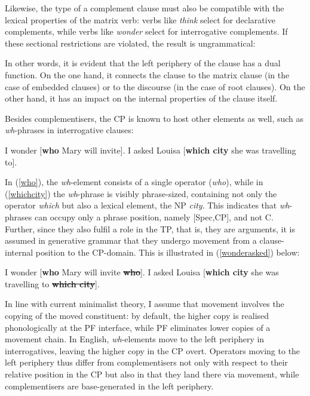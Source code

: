 \ea \label{finnonfin}
\z
\z

Likewise, the type of a complement clause must also be compatible with the lexical properties of the matrix verb: verbs like \textit{think} select for declarative complements, while verbs like \textit{wonder} select for interrogative complements. If these sectional restrictions are violated, the result is ungrammatical:

\ea
{}
\z
\z

In other words, it is evident that the left periphery of the clause has a dual function. On the one hand, it connects the clause to the matrix clause (in the case of embedded clauses) or to the discourse (in the case of root clauses). On the other hand, it has an impact on the internal properties of the clause itself.

Besides complementisers, the CP is known to host other elements as well, such as \textit{wh}-phrases in interrogative clauses:

\ea \label{wh}
\ea I wonder [\textbf{who} Mary will invite]. \label{who}
\ex I asked Louisa [\textbf{which city} she was travelling to]. \label{whichcity}
\z
\z

In (\ref{who}), the \textit{wh}-element consists of a single operator (\textit{who}), while in (\ref{whichcity}) the \textit{wh}-phrase is visibly phrase-sized, containing not only the operator \textit{which} but also a lexical element, the NP \textit{city}. This indicates that \textit{wh}-phrases can occupy only a phrase position, namely [Spec,CP], and not C. Further, since they also fulfil a role in the TP, that is, they are arguments, it is assumed in generative grammar that they undergo movement from a clause-internal position to the CP-domain. This is illustrated in (\ref{wonderasked}) below:

\ea \label{wonderasked}
\ea I wonder [\textbf{who} Mary will invite \sout{\textbf{who}}].
\ex I asked Louisa [\textbf{which city} she was travelling to \sout{\textbf{which city}}].
\z
\z

In line with current minimalist theory, I assume that movement involves the copying of the moved constituent: by default, the higher copy is realised phonologically at the PF interface, while PF eliminates lower copies of a movement chain. In English, \textit{wh}-elements move to the left periphery in interrogatives, leaving the higher copy in the CP overt. Operators moving to the left periphery thus differ from complementisers not only with respect to their relative position in the CP but also in that they land there via movement, while complementisers are base-generated in the left periphery.

